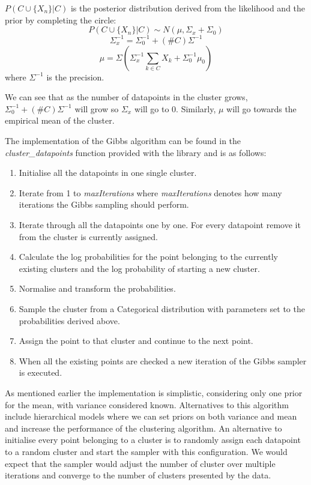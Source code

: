 \documentclass[12pt,a4paper]{article}
\begin{document}
$P(C \cup \{X_{n}\}|C)$ is the posterior distribution derived from the likelihood and the prior by completing the circle:
$$P(C \cup \{X_{n}\}|C) \sim N(\mu, \Sigma_{x} + \Sigma_{0})$$
$$\Sigma_{x}^{-1} = \Sigma_{0}^{-1} + (\#C)\Sigma^{-1}$$
$$\mu = \Sigma(\Sigma_{x}^{-1}\sum_{k \in C}X_{k} + \Sigma_{0}^{-1}\mu_{0})$$
where $\Sigma^{-1}$ is the precision.

We can see that as the number of datapoints in the cluster grows, $\Sigma_{0}^{-1} + (\#C)\Sigma^{-1}$ will grow so $\Sigma_{x}$ will go to 0. Similarly, $\mu$ will go towards the empirical mean of the cluster.

The implementation of the Gibbs algorithm can be found in the \textit{cluster\_datapoints} function provided with the library and is as follows:

\begin{enumerate}
    \item Initialise all the datapoints in one single cluster.
    \item Iterate from 1 to \textit{maxIterations} where \textit{maxIterations} denotes how many iterations the Gibbs sampling should perform. 
    \item Iterate through all the datapoints one by one. For every datapoint remove it from the cluster is currently assigned.
    \item Calculate the log probabilities for the point belonging to the currently existing clusters and the log probability of starting a new cluster.
    \item Normalise and transform the probabilities.
    \item Sample the cluster from a Categorical distribution with parameters set to the probabilities derived above.
    \item Assign the point to that cluster and continue to the next point.
    \item When all the existing points are checked a new iteration of the Gibbs sampler is executed. 
\end{enumerate}

As mentioned earlier the implementation is simplistic, considering only one prior for the mean, with variance considered known. Alternatives to this algorithm include hierarchical models where we can set priors on both variance and mean and increase the performance of the clustering algorithm. An alternative to initialise every point belonging to a cluster is to randomly assign each datapoint to a random cluster and start the sampler with this configuration. We would expect that the sampler would adjust the number of cluster over multiple iterations and converge to the number of clusters presented by the data.
\end{document}
